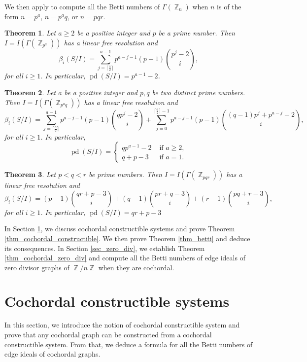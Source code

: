 \documentclass[12pt,amscd]{amsart}
\newtheorem{thm}{Theorem}[section]
\theoremstyle{definition}
\numberwithin{equation}{section}
\DeclareMathOperator{\ZZ}{\mathbb {Z}}
\DeclareMathOperator{\pd}{pd}
\begin{document}
We then apply to compute all the Betti numbers of $\Gamma(\ZZ_n)$ when $n$ is of the form $n = p^a$, $n = p^aq$, or $n = pqr$.
\begin{thm}\label{thm_betti_div_1} Let $a \ge 2$ be a positive integer and $p$ be a prime number. Then $I = I(\Gamma(\ZZ_{p^a}))$ has a linear free resolution and  
$$\beta_i(S/I) = \sum_{j= \lceil \frac{a}{2} \rceil}^{a-1} p^{a-j-1}(p-1) \binom{p^j - 2}{i},$$
for all $i \ge 1$. In particular, $\pd(S/I) = p^{a-1} -2$.    
\end{thm}


\begin{thm}\label{thm_betti_div_2} Let $a$ be a positive integer and $p,q$ be two distinct prime numbers. Then $I = I(\Gamma (\ZZ_{p^a q}))$ has a linear free resolution and 
$$ \beta_i(S/I) = \sum_{j= \lceil \frac{a}{2} \rceil}^{a-1} p^{a-j-1}(p-1) \binom{qp^j - 2}{i} + \sum_{j=0}^{\lceil \frac{a}{2} \rceil - 1} p^{a-j-1}(p-1) \binom{(q-1)p^j + p^{a-j} -2}{i},$$
for all $i \ge 1$. In particular, 
$$\pd(S/I) = \begin{cases} 
qp^{a-1} - 2 & \text{ if } a \ge 2, \\
q +p  - 3 & \text{ if } a = 1.\end{cases}$$        
\end{thm}

\begin{thm}\label{thm_betti_div_3} Let $p<q<r$ be prime numbers. Then $I = I(\Gamma(\ZZ_{pqr}))$ has a linear free resolution and 
$$\beta_i(S/I) = (p-1) \binom{qr +p -3}{i} + (q-1) \binom{pr + q -3}{i} + (r-1) \binom{pq+r-3}{i},$$
for all $i \ge 1$. In particular, $\pd(S/I) = qr + p - 3$     
\end{thm}

In Section \ref{sec_cochodal_constructible}, we discuss cochordal constructible systems and prove Theorem \ref{thm_cochordal_constructible}. We then prove Theorem \ref{thm_betti} and deduce its consequences. In Section \ref{sec_zero_div}, we establish Theorem \ref{thm_cochordal_zero_div} and compute all the Betti numbers of edge ideals of zero divisor graphs of $\ZZ/n\ZZ$ when they are cochordal.

\section{Cochordal constructible systems}\label{sec_cochodal_constructible}
In this section, we introduce the notion of cochordal constructible system and prove that any cochordal graph can be constructed from a cochordal constructible system. From that, we deduce a formula for all the Betti numbers of edge ideals of cochordal graphs.
\end{document}
